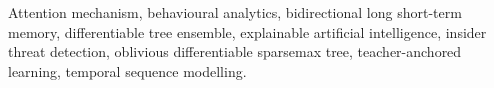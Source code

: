 \documentclass{ieeeaccess}
\begin{document}
\begin{keywords}
Attention mechanism,
behavioural analytics,
bidirectional long short-term memory,
differentiable tree ensemble,
explainable artificial intelligence,
insider threat detection,
oblivious differentiable sparsemax tree,
teacher-anchored learning,
temporal sequence modelling.
\end{keywords}
\titlepgskip=-21pt
\maketitle




\FloatBarrier

\FloatBarrier

\FloatBarrier

\end{document}
